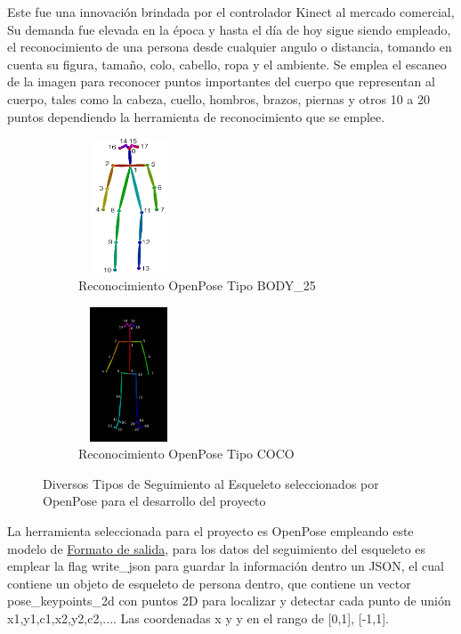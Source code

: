 Este fue una innovación brindada por el controlador Kinect al mercado comercial, Su demanda fue elevada en la época y hasta el día de hoy sigue siendo empleado, el reconocimiento de una persona desde cualquier angulo o distancia, tomando en cuenta su figura, tamaño, colo, cabello, ropa y el ambiente. Se emplea el escaneo de la imagen para reconocer puntos importantes del cuerpo que representan al cuerpo, tales como la cabeza, cuello, hombros, brazos, piernas y otros 10 a 20 puntos dependiendo la herramienta de reconocimiento que se emplee.


\begin{figure}[ht]
	\centering
	\begin{subfigure}{.5\textwidth}
		\centering
		\includegraphics[width=3cm,height=4cm]{./Images/openposet1.png}
		\caption{Reconocimiento OpenPose Tipo BODY\_25}
		\label{open1}
	\end{subfigure}%
	\begin{subfigure}{.5\textwidth}
		\centering
		\includegraphics[width=3cm,height=4cm]{./Images/openposet2.png}
		\caption{Reconocimiento OpenPose Tipo COCO}
		\label{open2}
	\end{subfigure}
	\caption{Diversos Tipos de Seguimiento al Esqueleto seleccionados por OpenPose para el desarrollo del proyecto}
	\label{exampleesqueletotrack}
\end{figure}

La herramienta seleccionada para el proyecto es OpenPose empleando este modelo de \href{https://github.com/CMU-Perceptual-Computing-Lab/openpose/blob/master/doc/output.md}{Formato de salida}, para los datos del seguimiento del esqueleto es emplear la flag write\_json para guardar la información dentro un JSON, el cual contiene un objeto de esqueleto de persona dentro, que contiene un vector pose\_keypoints\_2d con puntos 2D para localizar y detectar cada punto de unión x1,y1,c1,x2,y2,c2,.... Las coordenadas x y y en el rango de [0,1], [-1,1].

